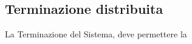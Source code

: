\newpage
\subsection{Terminazione distribuita}\label{sec:distributed_termination}

La Terminazione del Sistema, deve permettere la 
